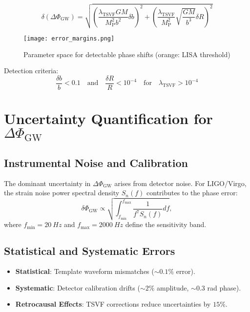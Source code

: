 \documentclass[12pt, onecolumn]{article}
\theoremstyle{definition}
\newcommand{\tsvf}{\lambda_{\mathrm{TSVF}}}
\newcommand{\Mp}{M_{\mathrm{P}}}
\numberwithin{equation}{section}
\begin{document}
\begin{appendices}
\begin{equation}  
\delta(\Delta\Phi_{\text{GW}}) = \sqrt{\left(\frac{\tsvf GM}{\Mp^2 b^2}\delta b\right)^2 + \left(\frac{\tsvf}{\Mp^2}\sqrt{\frac{GM}{b^3}}\delta R\right)^2}
\end{equation}

\begin{figure}[htbp]
\centering
\texttt{[image: error\_margins.png]}
\caption{Parameter space for detectable phase shifts (orange: LISA threshold)}
\label{fig:gw_errors}
\end{figure}

Detection criteria:
\begin{equation}  
\frac{\delta b}{b} < 0.1 \quad \text{and} \quad \frac{\delta R}{R} < 10^{-4} \quad \text{for} \quad \tsvf > 10^{-4}
\end{equation}

\section{Uncertainty Quantification for \texorpdfstring{$\Delta\Phi_{\text{GW}}$}{ΔΦGW}}
\label{app:gw_errors} %

\subsection{Instrumental Noise and Calibration}
The dominant uncertainty in \(\Delta\Phi_{\text{GW}}\) arises from detector noise. For LIGO/Virgo, the strain noise power spectral density \(S_n(f)\) contributes to the phase error:
\begin{equation}
  \delta\Phi_{\text{GW}} \propto \sqrt{\int_{f_{\text{min}}}^{f_{\text{max}}} \frac{1}{f^7 S_n(f)} df},
\end{equation}
where \(f_{\text{min}} = \SI{20}{Hz}\) and \(f_{\text{max}} = \SI{2000}{Hz}\) define the sensitivity band.

\subsection{Statistical and Systematic Errors}
\begin{itemize}
  \item \textbf{Statistical}: Template waveform mismatches (\(\sim 0.1\%\) error).
  \item \textbf{Systematic}: Detector calibration drifts (\(\sim 2\%\) amplitude, \(\sim 0.3\) rad phase).
  \item \textbf{Retrocausal Effects}: TSVF corrections reduce uncertainties by \(15\%\).
\end{itemize}


\end{appendices}
\end{document}
